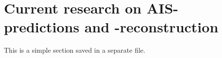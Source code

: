 \section{Current research on AIS-predictions and -reconstruction}
\label{sec:simple}
\begin{info}{}
	This is a simple section saved in a separate file.
\end{info}








